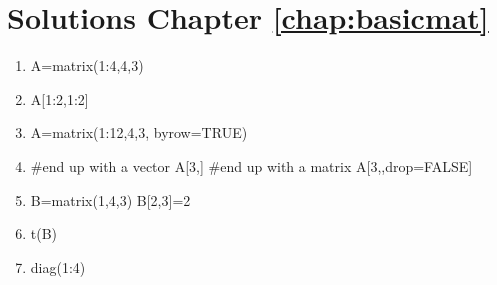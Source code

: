 
\chapter*{Solutions Chapter \ref{chap:basicmat}}


\begin{enumerate}
\item 
\begin{Schunk}
\begin{Sinput}
 A=matrix(1:4,4,3)
\end{Sinput}
\end{Schunk}
\item 
\begin{Schunk}
\begin{Sinput}
 A[1:2,1:2]
\end{Sinput}
\end{Schunk}
\item
\begin{Schunk}
\begin{Sinput}
 A=matrix(1:12,4,3, byrow=TRUE)
\end{Sinput}
\end{Schunk}

\item
\begin{Schunk}
\begin{Sinput}
 #end up with a vector
 A[3,]
 #end up with a matrix
 A[3,,drop=FALSE]
\end{Sinput}
\end{Schunk}

\item
\begin{Schunk}
\begin{Sinput}
 B=matrix(1,4,3)
 B[2,3]=2
\end{Sinput}
\end{Schunk}

\item 
\begin{Schunk}
\begin{Sinput}
 t(B)
\end{Sinput}
\end{Schunk}

\item
\begin{Schunk}
\begin{Sinput}
 diag(1:4)
\end{Sinput}
\end{Schunk}


\end{enumerate}
